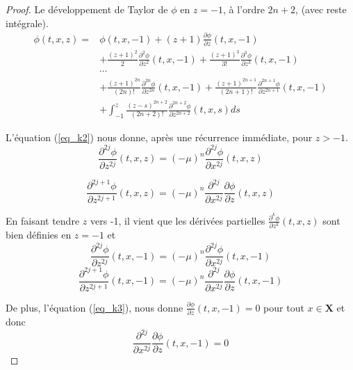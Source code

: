 \documentclass[12pt,a4paper]{article}
\numberwithin{equation}{section}
\begin{document}
\begin{proof}
Le développement de Taylor de $\phi$ en $z = -1$, à l'ordre $2n+2$, (avec reste intégrale).
\begin{equation*}
\begin{split}
    \phi(t,x,z) = &\phi(t,x,-1) + (z+1)\frac{\partial \phi}{\partial z}(t,x,-1)\\
    &+ \frac{(z+1)^2}{2}\frac{\partial^2 \phi}{\partial z^2}(t,x,-1) + \frac{(z+1)^3}{3!}\frac{\partial^3 \phi}{\partial z^3}(t,x,-1)\\
    & \cdots\\
    &+ \frac{(z+1)^{2n}}{(2n)!}\frac{\partial^{2n} \phi}{\partial z^{2n}}(t,x,-1) + \frac{(z+1)^{2n+1}}{(2n+1)!}\frac{\partial^{2n+1} \phi}{\partial z^{2n+1}}(t,x,-1)\\
    &+\int_{-1}^z\frac{(z-s)^{2n+2}}{(2n+2)!}\frac{\partial^{2n+2} \phi}{\partial z^{2n+2}}(t,x,s)ds
\end{split}
\end{equation*}

L'équation (\ref{eq_k2}) nous donne, après une récurrence immédiate, pour $z>-1$.
\begin{equation*}
    \frac{\partial^{2j} \phi}{\partial z^{2j}}(t,x,z) = (-\mu)^{n}\frac{\partial^{2j} \phi}{\partial x^{2j}}(t,x,z)
\end{equation*}

\begin{equation*}
    \frac{\partial^{2j+1} \phi}{\partial z^{2j+1}}(t,x,z) = (-\mu)^{n}\frac{\partial^{2j}}{\partial x^{2j}}\frac{\partial \phi}{\partial z}(t,x,z)
\end{equation*}

En faisant tendre $z$ vers -1, il vient que les dérivées partielles $\frac{\partial^{k} \phi}{\partial z^{k}}(t,x,z)$ sont bien définies en $z = -1$ et 
\begin{equation*}
    \frac{\partial^{2j} \phi}{\partial z^{2j}}(t,x,-1) = (-\mu)^{n}\frac{\partial^{2j} \phi}{\partial x^{2j}}(t,x,-1)
\end{equation*}
\begin{equation*}
    \frac{\partial^{2j+1} \phi}{\partial z^{2j+1}}(t,x,-1) = (-\mu)^{n}\frac{\partial^{2j}}{\partial x^{2j}}\frac{\partial \phi}{\partial z}(t,x,-1)
\end{equation*}

De plus, l'équation (\ref{eq_k3}), nous donne $\frac{\partial \phi}{\partial z}(t,x,-1) = 0$ pour tout $x\in \textbf{X}$ et donc 
\begin{equation*}
    \frac{\partial^{2j}}{\partial x^{2j}}\frac{\partial \phi}{\partial z}(t,x,-1) = 0
\end{equation*}


\end{proof}
\end{document}
